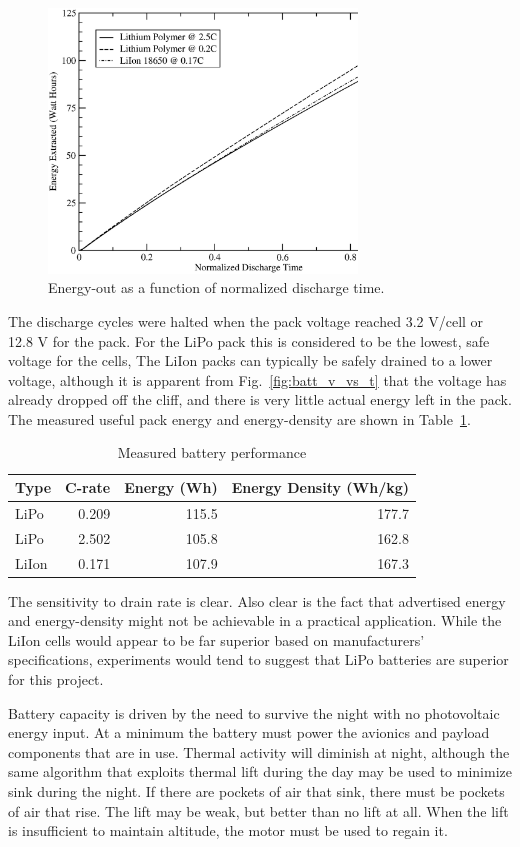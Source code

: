 \documentclass{ifacconf}
\begin{document}
\begin{figure}
  \centering
  \includegraphics[width=82mm]{Figures/Energy_v_time.eps}
  \caption{Energy-out as a function of normalized discharge time.}
  \label{fig:batt_e_vs_t}
\end{figure}

The discharge cycles were halted when the pack voltage reached 3.2 V/cell or 12.8 V for the pack. For the LiPo pack this is considered to be the lowest, safe voltage for the cells, The LiIon packs can typically be safely drained to a lower voltage, although it is apparent from Fig.~\ref{fig:batt_v_vs_t} that the voltage has already dropped off the cliff, and there is very little actual energy left in the pack. The measured useful pack energy and energy-density are shown in Table~\ref{batt_performance}.
\begin{table}
  \caption{Measured battery performance}
  \centering
  \begin{tabular}{ l | r | r | r }
  Type &C-rate & Energy (Wh) & Energy Density (Wh/kg) \\
  \hline
  LiPo & 0.209 & 115.5 & 177.7 \\
  LiPo & 2.502 & 105.8 & 162.8 \\
  LiIon & 0.171 & 107.9 & 167.3 \\
  \end{tabular}
  \label{batt_performance}
\end{table}

The sensitivity to drain rate is clear. Also clear is the fact that advertised energy and energy-density might not be achievable in a practical application. While the LiIon cells would appear to be far superior based on manufacturers' specifications, experiments would tend to suggest that LiPo batteries are superior for this project.

Battery capacity is driven by the need to survive the night with no photovoltaic energy input. At a minimum the battery must power the avionics and payload components that are in use. Thermal activity will diminish at night, although the same algorithm that exploits thermal lift during the day may be used to minimize sink during the night. If there are pockets of air that sink, there must be pockets of air that rise. The lift may be weak, but better than no lift at all. When the lift is insufficient to maintain altitude, the motor must be used to regain it.
\end{document}
